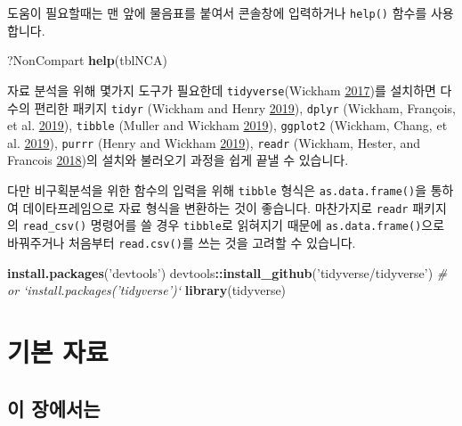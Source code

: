 \documentclass[12pt,]{krantz}
\newenvironment{Shaded}{\begin{snugshade}}{\end{snugshade}}
\newcommand{\CommentTok}[1]{\textcolor[rgb]{0.56,0.35,0.01}{\textit{#1}}}
\newcommand{\KeywordTok}[1]{\textcolor[rgb]{0.13,0.29,0.53}{\textbf{#1}}}
\newcommand{\NormalTok}[1]{#1}
\newcommand{\OperatorTok}[1]{\textcolor[rgb]{0.81,0.36,0.00}{\textbf{#1}}}
\newcommand{\StringTok}[1]{\textcolor[rgb]{0.31,0.60,0.02}{#1}}
\begin{document}
도움이 필요할때는 맨 앞에 물음표를 붙여서 콘솔창에 입력하거나 \texttt{help()} 함수를 사용합니다.

\begin{Shaded}
\begin{Highlighting}[]
\NormalTok{?NonCompart}
\KeywordTok{help}\NormalTok{(tblNCA)}
\end{Highlighting}
\end{Shaded}

자료 분석을 위해 몇가지 도구가 필요한데 \texttt{tidyverse}(Wickham \protect\hyperlink{ref-R-tidyverse}{2017})를 설치하면 다수의 편리한 패키지 \texttt{tidyr} (Wickham and Henry \protect\hyperlink{ref-R-tidyr}{2019}), \texttt{dplyr} (Wickham, François, et al. \protect\hyperlink{ref-R-dplyr}{2019}), \texttt{tibble} (Muller and Wickham \protect\hyperlink{ref-R-tibble}{2019}), \texttt{ggplot2} (Wickham, Chang, et al. \protect\hyperlink{ref-R-ggplot2}{2019}), \texttt{purrr} (Henry and Wickham \protect\hyperlink{ref-R-purrr}{2019}), \texttt{readr} (Wickham, Hester, and Francois \protect\hyperlink{ref-R-readr}{2018})의 설치와 불러오기 과정을 쉽게 끝낼 수 있습니다.

다만 비구획분석을 위한 함수의 입력을 위해 \texttt{tibble} 형식은 \texttt{as.data.frame()}을 통하여 데이타프레임으로 자료 형식을 변환하는 것이 좋습니다.
마찬가지로 \texttt{readr} 패키지의 \texttt{read\_csv()} 명령어를 쓸 경우 \texttt{tibble}로 읽혀지기 때문에 \texttt{as.data.frame()}으로 바꿔주거나 처음부터 \texttt{read.csv()}를 쓰는 것을 고려할 수 있습니다.

\begin{Shaded}
\begin{Highlighting}[]
\KeywordTok{install.packages}\NormalTok{(}\StringTok{'devtools'}\NormalTok{)}
\NormalTok{devtools}\OperatorTok{::}\KeywordTok{install_github}\NormalTok{(}\StringTok{'tidyverse/tidyverse'}\NormalTok{) }
\CommentTok{# or `install.packages('tidyverse')`}
\KeywordTok{library}\NormalTok{(tidyverse)}
\end{Highlighting}
\end{Shaded}

\hypertarget{datasets}{%
\chapter{기본 자료}\label{datasets}}

\hypertarget{introdatasets}{%
\section{이 장에서는}\label{introdatasets}}
\end{document}
